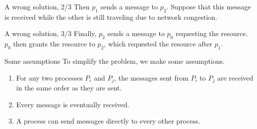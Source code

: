 \documentclass[12pt]{beamer}
\begin{document}
    \begin{frame}{A wrong solution, 2/3}
        Then \(p_1\) sends a message to \(p_2\). Suppose that this message is
        received while the other is still traveling due to network congestion.
        \begin{figure}
        \end{figure}
    \end{frame}

    \begin{frame}{A wrong solution, 3/3}
        Finally, \(p_2\) sends a message to \(p_0\) requesting the resource.
        \(p_0\) then grants the resource to \(p_2\), which requested the
        resource after \(p_1\).
        \begin{figure}
        \end{figure}
    \end{frame}

    \begin{frame}{Some assumptions}
        To simplify the problem, we make some assumptions.
        \begin{enumerate}
            \item For any two processes \(P_i\) and \(P_j\), the messages sent from
            \(P_i\) to \(P_j\) are received in the same order as they are sent.
            \item Every message is eventually received.
            \item A process can send messages directly to every other process.
        \end{enumerate}
    \end{frame}
\end{document}
